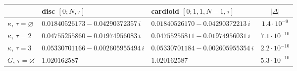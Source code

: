 \begin{tabular}{@{}lllc@{}}
\toprule
& disc $[0;N,\tau]$ & cardioid $[0;1,1,N-1,\tau]$ & $|\Delta|$ \\
\midrule
$\kappa$, $\tau=\varnothing$ & $0.01840526173 - 0.04290372357\,i$ & $0.01840526170 - 0.04290372213\,i$ & $1.4\cdot10^{-9}$ \\
$\kappa$, $\tau=2$ & $0.04755255860 - 0.01974956083\,i$ & $0.04755255811 - 0.01974956031\,i$ & $7.1\cdot10^{-10}$ \\
$\kappa$, $\tau=3$ & $0.05330701166 - 0.002605955494\,i$ & $0.05330701184 - 0.002605955354\,i$ & $2.2\cdot10^{-10}$ \\
$G$, $\tau=\varnothing$ & $1.020162587$ & $1.020162587$ & $5.3\cdot10^{-10}$ \\
\bottomrule
\end{tabular}
